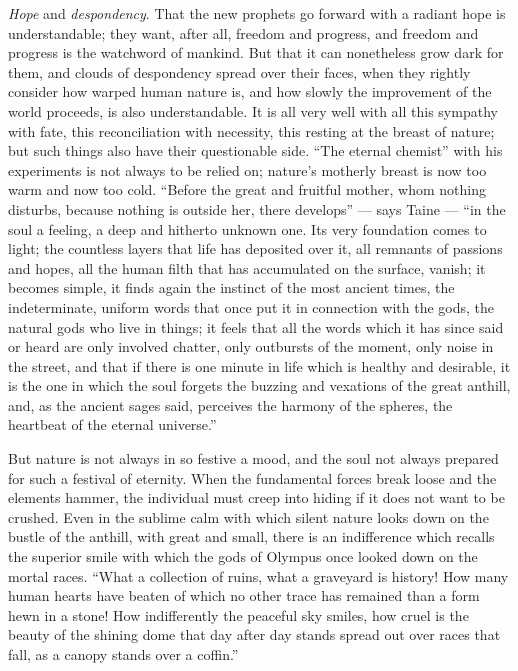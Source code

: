 \documentclass[12pt,a4paper,openany]{book}
\newcommand{\opage}[1]{\marginnote{\footnotesize\textit{[#1]}}}
\begin{document}
\emph{Hope} and \emph{despondency}. That the new prophets go forward
with a radiant hope is understandable; they want, after all, freedom
and progress, and freedom and progress is the watchword of mankind.
But that it can nonetheless grow dark for them,
and clouds of despondency spread over their faces, when they
rightly consider how warped human nature is, and
how slowly the improvement of the world proceeds, is
also understandable. It is all very well with all this
sympathy with fate, this reconciliation with necessity,
this resting at the breast of nature; but such things also have
their questionable side. ``The eternal chemist'' with his
experiments is not always to be relied on; nature's motherly breast
is now too warm and now too cold. ``Before the
great and fruitful mother, whom nothing disturbs, because
nothing is outside her, there develops'' --- says Taine ---
``in the soul a feeling, a deep and hitherto unknown one. Its very
foundation comes to light; the countless layers
that life has deposited over it, all remnants of passions
and hopes, all the human filth
that has accumulated on the surface, vanish; it
becomes simple, it finds again the instinct of the most ancient times,
\setcounter{footnote}{0}%
\opage{90}the indeterminate, uniform words that once put it in
connection with the gods, the natural gods who live
in things; it feels that all the words which it has since
said or heard are only involved chatter, only outbursts of the
moment, only noise in the street, and that if there
is one minute in life which is healthy and desirable,
it is the one in which the soul forgets the buzzing and vexations
of the great anthill, and, as the ancient sages
said, perceives the harmony of the spheres, the heartbeat
of the eternal universe.''

But nature is not always in so festive a mood, and
the soul not always prepared for such a festival of eternity.
When the fundamental forces break loose and the elements
hammer, the individual must creep into hiding if it does not want
to be crushed. Even in the sublime calm with which silent
nature looks down on the bustle of the anthill, with great and
small, there is an indifference which recalls the
superior smile with which the gods of Olympus once looked
down on the mortal races. ``What a collection of
ruins, what a graveyard is history! How
many human hearts have beaten of which
no other trace has remained than a form
hewn in a stone! How indifferently the
peaceful sky smiles, how cruel is the beauty of the shining
dome that day after day stands spread out
over races that fall, as a canopy stands
over a coffin.''
\end{document}
